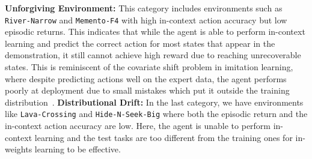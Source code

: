 \documentclass[]{fairmeta}
\begin{document}
\textbf{Unforgiving Environment:} This category includes environments such as \texttt{River-Narrow} and \texttt{Memento-F4} with high in-context action accuracy but low episodic returns. This indicates that while the agent is able to perform in-context learning and predict the correct action for most states that appear in the demonstration, it still cannot achieve high reward due to reaching unrecoverable states.
This is reminiscent of the covariate shift problem in imitation learning, where despite predicting actions well on the expert data, the agent performs poorly at deployment due to small mistakes which put it outside the training distribution~\citep{ross2011reduction}.
\textbf{Distributional Drift:} In the last category, we have environments like \texttt{Lava-Crossing} and \texttt{Hide-N-Seek-Big} where both the episodic return and the in-context action accuracy are low. Here, the agent is unable to perform in-context learning and the test tasks are too different from the training ones for in-weights learning to be effective.
\end{document}
